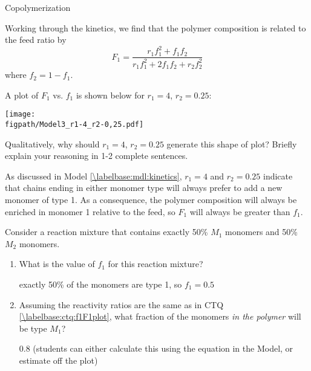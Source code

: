 \begin{activity}{Copolymerization}
\begin{model}
	Working through the kinetics, we find that the polymer composition is related to the feed ratio by
	\begin{equation*}
		F_1 = \frac{r_1f_1^2 + f_1f_2}{r_1f_1^2+2f_1f_2 + r_2f_2^2}
	\end{equation*}
	where $f_2 = 1-f_1$.

\end{model}

\clearpage
\begin{ctqs}
	\question \label{\labelbase:ctq:f1F1plot} A plot of $F_1$ vs. $f_1$ is shown below for $r_1 = 4$, $r_2=0.25$: 
	
		\vspace{3pt}
		\centerline{\texttt{[image: \\figpath/Model3\_r1-4\_r2-0,25.pdf]}}
	
		Qualitatively, why should $r_1 = 4$, $r_2=0.25$ generate this shape of plot?  Briefly explain your reasoning in 1-2 complete sentences.
				
		\begin{solution}[1.5in]{}
			As discussed in Model \ref{\labelbase:mdl:kinetics}, $r_1=4$ and $r_2=0.25$ indicate that chains ending in either monomer type will always prefer to add a new monomer of type 1.  As a consequence, the polymer composition will always be enriched in monomer 1 relative to the feed, so $F_1$ will always be greater than $f_1$.
		\end{solution}
		
	\question Consider a reaction mixture that contains exactly 50\% $M_1$ monomers and 50\% $M_2$ monomers.
	
		\begin{enumerate}
			\item What is the value of $f_1$ for this reaction mixture?
			
				\begin{solution}[0.5in]{}
					exactly 50\% of the monomers are type 1, so $f_1=0.5$
				\end{solution}
			
			\item Assuming the reactivity ratios are the same as in CTQ \ref{\labelbase:ctq:f1F1plot}, what fraction of the monomers \emph{in the polymer} will be type $M_1$?
			
				\begin{solution}[0.5in]{}
					0.8 (students can either calculate this using the equation in the Model, or estimate off the plot)
				\end{solution}
			

\end{enumerate}
\end{ctqs}
\end{activity}
